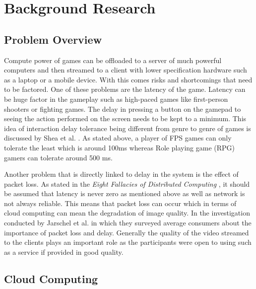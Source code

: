 \chapter{Background Research}
\label{chapter2}

\section{Problem Overview}
Compute power of games can be offloaded to a server of much powerful computers and then streamed to a client with lower specification hardware such as a laptop or a mobile device. With this comes risks and shortcomings that need to be factored. One of these problems are the latency of the game. Latency can be huge factor in the gameplay such as high-paced games like first-person shooters or fighting games. The delay in pressing a button on the gamepad to seeing the action performed on the screen needs to be kept to a minimum. This idea of interaction delay tolerance being different from genre to genre of games is discussed by Shea et al. \cite{shea2013cloud}. As stated above, a player of FPS games can only tolerate the least which is around 100ms whereas Role playing game (RPG) gamers can tolerate around 500 ms.
\par
Another problem that is directly linked to delay in the system is the effect of packet loss. As stated in the \textit{Eight Fallacies of Distributed Computing} \cite{deutsch1994eight}, it should be assumed that latency is never zero as mentioned above as well as network is not always reliable. This means that packet loss can occur which in terms of cloud computing can mean the degradation of image quality. In the investigation conducted by Jarschel et al. \cite{jarschel2011evaluation} in which they surveyed average consumers about the importance of packet loss and delay. Generally the quality of the video streamed to the clients plays an important role as the participants were open to using such as a service if provided in good quality.

\section{Cloud Computing}
\lipsum[1-1]

